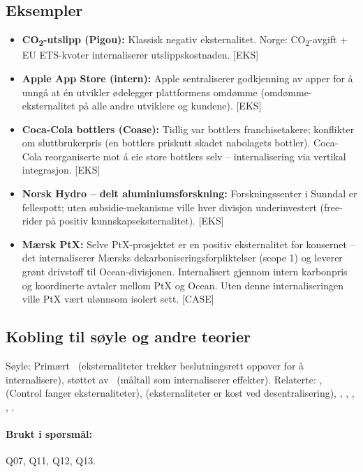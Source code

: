 \subsection*{Eksempler}
\begin{itemize}
\item \textbf{CO\textsubscript{2}-utslipp (Pigou):} Klassisk negativ eksternalitet. Norge: CO\textsubscript{2}-avgift + EU ETS-kvoter internaliserer utslippskostnaden. [EKS]
\item \textbf{Apple App Store (intern):} Apple sentraliserer godkjenning av apper for å unngå at én utvikler ødelegger plattformens omdømme (omdømme-eksternalitet på alle andre utviklere og kundene). [EKS]
\item \textbf{Coca-Cola bottlers (Coase):} Tidlig var bottlers franchisetakere; konflikter om sluttbrukerpris (en bottlers priskutt skadet nabolagets bottler). Coca-Cola reorganiserte mot å eie store bottlers selv -- internalisering via vertikal integrasjon. [EKS]
\item \textbf{Norsk Hydro -- delt aluminiumsforskning:} Forskningssenter i Sunndal er fellespott; uten subsidie-mekanisme ville hver divisjon underinvestert (free-rider på positiv kunnskaps\-eksternalitet). [EKS]
\item \textbf{Mærsk PtX:} Selve PtX-prosjektet er en positiv eksternalitet for konsernet -- det internaliserer Mærsks dekarboniseringsforpliktelser (scope 1) og leverer grønt drivstoff til Ocean-divisjonen. Internalisert gjennom intern karbonpris og koordinerte avtaler mellom PtX og Ocean. Uten denne internaliseringen ville PtX vært ulønnsom isolert sett. [CASE]
\end{itemize}

\subsection*{Kobling til søyle og andre teorier}
Søyle: Primært \SOne\ (eksternaliteter trekker beslutningsrett oppover for å internalisere), støttet av \STwo\ (måltall som internaliserer effekter). Relaterte: ,  (Control fanger eksternaliteter),  (eksternaliteter er kost ved desentralisering), , , , , .

\paragraph{Brukt i spørsmål:} Q07, Q11, Q12, Q13.
